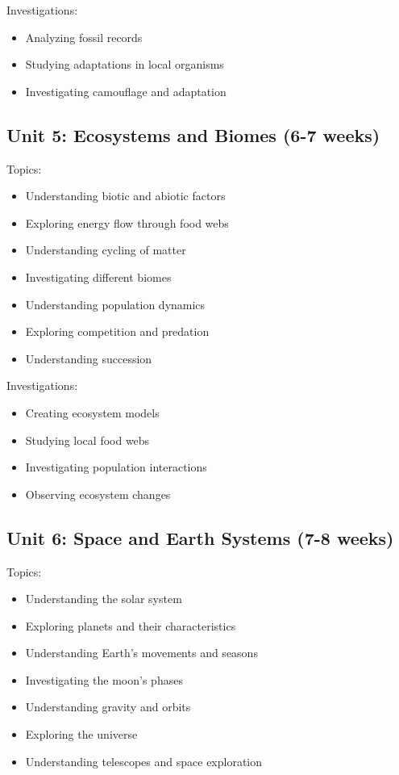 \documentclass[11pt,letterpaper]{report}
\begin{document}
Investigations:
\begin{itemize}
\item Analyzing fossil records
\item Studying adaptations in local organisms
\item Investigating camouflage and adaptation
\end{itemize}

\subsection{Unit 5: Ecosystems and Biomes (6-7 weeks)}

Topics:
\begin{itemize}
\item Understanding biotic and abiotic factors
\item Exploring energy flow through food webs
\item Understanding cycling of matter
\item Investigating different biomes
\item Understanding population dynamics
\item Exploring competition and predation
\item Understanding succession
\end{itemize}

Investigations:
\begin{itemize}
\item Creating ecosystem models
\item Studying local food webs
\item Investigating population interactions
\item Observing ecosystem changes
\end{itemize}

\subsection{Unit 6: Space and Earth Systems (7-8 weeks)}

Topics:
\begin{itemize}
\item Understanding the solar system
\item Exploring planets and their characteristics
\item Understanding Earth's movements and seasons
\item Investigating the moon's phases
\item Understanding gravity and orbits
\item Exploring the universe
\item Understanding telescopes and space exploration
\end{itemize}
\end{document}
